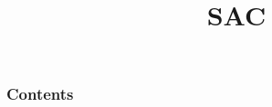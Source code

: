 \documentclass[11pt]{beamer}
\title{SAC}
\begin{document}
\begin{frame}
\titlepage
\end{frame}


\begin{frame}
    \frametitle{Contents}
    \tiny{\tableofcontents[currentsection]}
\end{frame}




\end{document}
